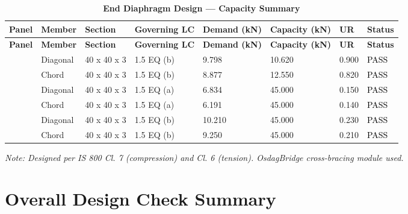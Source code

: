 \documentclass[12pt,a4paper]{report}
\numberwithin{table}{chapter}
\numberwithin{figure}{chapter}
\begin{document}
\begin{longtable}{|C{2.0cm}|L{1.8cm}|C{2.2cm}|C{3.0cm}|C{1.8cm}|C{1.8cm}|C{1.2cm}|C{1.8cm}|}
\caption{\textbf{End Diaphragm Design --- Capacity Summary}}
\hline
\textbf{Panel} & \textbf{Member} & \textbf{Section} & \textbf{Governing LC} & \textbf{Demand (kN)} & \textbf{Capacity (kN)} & \textbf{UR} & \textbf{Status} \\[6pt]
\hline
\endfirsthead
\hline
\textbf{Panel} & \textbf{Member} & \textbf{Section} & \textbf{Governing LC} & \textbf{Demand (kN)} & \textbf{Capacity (kN)} & \textbf{UR} & \textbf{Status} \\[6pt]
\hline
\endhead
{} & Diagonal & 40 x 40 x 3 & 1.5 EQ (b) & 9.798 & 10.620 & 0.900 & \textcolor{black}{PASS} \\[6pt]
 & Chord & 40 x 40 x 3 & 1.5 EQ (b) & 8.877 & 12.550 & 0.820 & \textcolor{black}{PASS} \\[6pt]
\hline
{} & Diagonal & 40 x 40 x 3 & 1.5 EQ (a) & 6.834 & 45.000 & 0.150 & \textcolor{black}{PASS} \\[6pt]
 & Chord & 40 x 40 x 3 & 1.5 EQ (a) & 6.191 & 45.000 & 0.140 & \textcolor{black}{PASS} \\[6pt]
\hline
{} & Diagonal & 40 x 40 x 3 & 1.5 EQ (b) & 10.210 & 45.000 & 0.230 & \textcolor{black}{PASS} \\[6pt]
 & Chord & 40 x 40 x 3 & 1.5 EQ (b) & 9.250 & 45.000 & 0.210 & \textcolor{black}{PASS} \\[6pt]
\hline
\end{longtable}
\noindent\textit{Note: Designed per IS 800 Cl. 7 (compression) and Cl. 6 (tension). OsdagBridge cross-bracing module used.}

\section{Overall Design Check Summary}
\label{sec:overall-summary}
\end{document}
